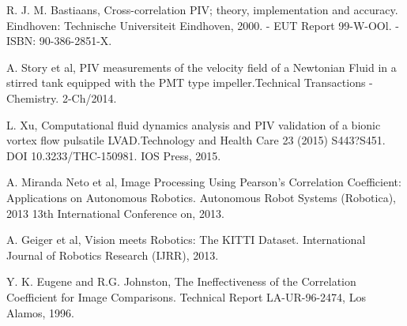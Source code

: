 \documentclass[letterpaper, 10 pt,conference]{ieeeconf}  %
\begin{document}
\begin{thebibliography}{99}

        
	 R. J. M. Bastiaans, Cross-correlation PIV; theory, implementation and accuracy. 
        Eindhoven: Technische Universiteit Eindhoven, 2000. - EUT Report 99-W-OOl. - ISBN: 90-386-2851-X.

	 A. Story et al, PIV measurements of the velocity field of a Newtonian Fluid in a stirred tank equipped 
	with the PMT type impeller.Technical Transactions - Chemistry. 2-Ch/2014.        

	 L. Xu, Computational fluid dynamics analysis and PIV validation of a bionic vortex flow 
	pulsatile LVAD.Technology and Health Care 23 (2015) S443?S451. DOI 10.3233/THC-150981. IOS Press, 2015.
	
         A. Miranda Neto et al, Image Processing Using Pearson's Correlation Coefficient: 
        Applications on Autonomous Robotics. 
        Autonomous Robot Systems (Robotica), 2013 13th International Conference on, 2013.
        
         A. Geiger et al,
        Vision meets Robotics: The KITTI Dataset. International Journal of Robotics Research (IJRR), 2013.
        
         Y. K. Eugene and R.G. Johnston, The Ineffectiveness of the Correlation Coefficient for Image Comparisons.
        Technical Report LA-UR-96-2474, Los Alamos, 1996.
        
        
	



\end{thebibliography}
\end{document}

